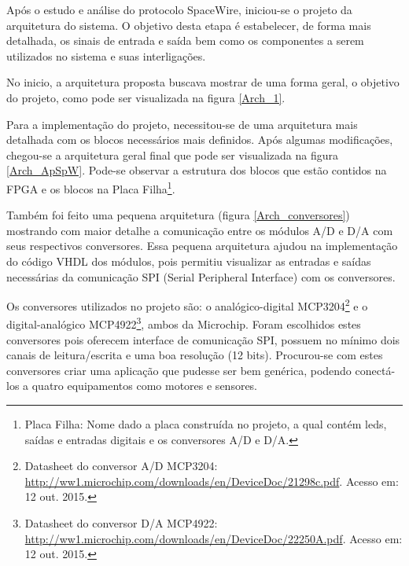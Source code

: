 Após o estudo e análise do protocolo SpaceWire, iniciou-se o projeto da arquitetura do sistema. O objetivo desta etapa é estabelecer, de forma mais detalhada, os sinais de entrada e saída bem como os componentes a serem utilizados no sistema e suas interligações.

No inicio, a arquitetura proposta buscava mostrar de uma forma geral, o objetivo do projeto, como pode ser visualizada na figura \ref{Arch_1}.

Para a implementação do projeto, necessitou-se de uma arquitetura mais detalhada com os blocos necessários mais definidos. Após algumas modificações, chegou-se a arquitetura geral final que pode ser visualizada na figura \ref{Arch_ApSpW}. Pode-se observar a estrutura dos blocos que estão contidos na FPGA e os blocos na Placa Filha\footnote{Placa Filha: Nome dado a placa construída no projeto, a qual contém leds, saídas e entradas digitais e os conversores A/D e D/A.}.

Também foi feito uma pequena arquitetura (figura \ref{Arch_conversores}) mostrando com maior detalhe a comunicação entre os módulos A/D e D/A com seus respectivos conversores. Essa pequena arquitetura ajudou na implementação do código VHDL dos módulos, pois permitiu visualizar as entradas e saídas necessárias da comunicação SPI (Serial Peripheral Interface) com os conversores.

Os conversores utilizados no projeto são: o analógico-digital MCP3204\footnote{\label{MCP3204}Datasheet do conversor A/D MCP3204: \url{http://ww1.microchip.com/downloads/en/DeviceDoc/21298c.pdf}. Acesso em: 12 out. 2015.} e o digital-analógico MCP4922\footnote{\label{MCP4922}Datasheet do conversor D/A MCP4922: \url{http://ww1.microchip.com/downloads/en/DeviceDoc/22250A.pdf}. Acesso em: 12 out. 2015.}, ambos da Microchip. Foram escolhidos estes conversores pois oferecem interface de comunicação SPI, possuem no mínimo dois canais de leitura/escrita e uma boa resolução (12 bits). Procurou-se com estes conversores criar uma aplicação que pudesse ser bem genérica, podendo conectá-los a quatro equipamentos como motores e sensores.

